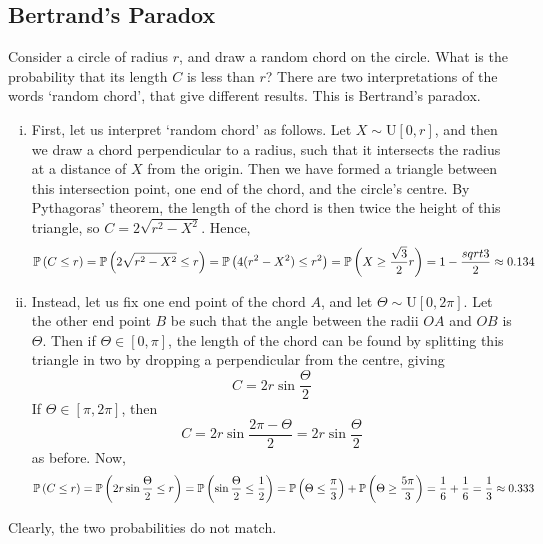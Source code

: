 \subsection{Bertrand's Paradox}
Consider a circle of radius \(r\), and draw a random chord on the circle.
What is the probability that its length \(C\) is less than \(r\)?
There are two interpretations of the words `random chord', that give different results.
This is Bertrand's paradox.
\begin{enumerate}[(i)]
	\item First, let us interpret `random chord' as follows.
	      Let \(X \sim \mathrm{U}[0, r]\), and then we draw a chord perpendicular to a radius, such that it intersects the radius at a distance of \(X\) from the origin.
	      Then we have formed a triangle between this intersection point, one end of the chord, and the circle's centre.
	      By Pythagoras' theorem, the length of the chord is then twice the height of this triangle, so \(C = 2\sqrt{r^2 - X^2}\).
	      Hence,
	      \[
		      \mathbb{P}\left({C \leq r}\right) = \mathbb{P}\left({2\sqrt{r^2 - X^2} \leq r}\right) = \mathbb{P}\left({4(r^2 - X^2) \leq r^2}\right) = \mathbb{P}\left({X \geq \frac{\sqrt{3}}{2}r}\right) = 1 - \frac{sqrt 3}{2} \approx 0.134
	      \]
	\item Instead, let us fix one end point of the chord \(A\), and let \(\Theta \sim \mathrm{U}[0, 2\pi]\).
	      Let the other end point \(B\) be such that the angle between the radii \(OA\) and \(OB\) is \(\Theta\).
	      Then if \(\Theta \in [0, \pi]\), the length of the chord can be found by splitting this triangle in two by dropping a perpendicular from the centre, giving
	      \[
		      C = 2r\sin\frac{\Theta}{2}
	      \]
	      If \(\Theta \in [\pi, 2\pi]\), then
	      \[
		      C = 2r\sin\frac{2\pi - \Theta}{2} = 2r\sin\frac{\Theta}{2}
	      \]
	      as before.
	      Now,
	      \[
		      \mathbb{P}\left({C \leq r}\right) = \mathbb{P}\left({2r\sin\frac{\Theta}{2} \leq r}\right) = \mathbb{P}\left({\sin\frac{\Theta}{2} \leq \frac{1}{2}}\right) = \mathbb{P}\left({\Theta \leq \frac{\pi}{3}}\right) + \mathbb{P}\left({\Theta \geq \frac{5\pi}{3}}\right) = \frac{1}{6} + \frac{1}{6} = \frac{1}{3} \approx 0.333
	      \]
\end{enumerate}
Clearly, the two probabilities do not match.


